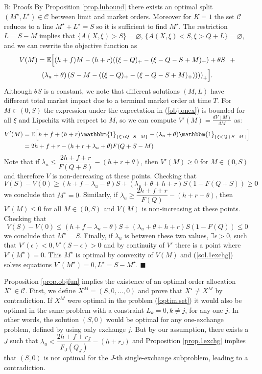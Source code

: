 \documentclass[opre,nonblindrev]{informs3}
\newcommand{\indicator}[1]{\mathbbm{1}_{\left\{ {#1} \right\} }}
\begin{document}
\begin{APPENDIX}{B: Proofs}
 By Proposition \ref{prop.lubound} there exists an optimal split $ (M^\star,L^\star)\in\mathcal{C}$ between limit and market orders. Moreover for $K=1$ the set $\mathcal{C}$ reduces to a line $M^\star+L^\star=S$ so it is sufficient to find $M^\star$. The restriction $L=S-M$ implies that $\{A(X,\xi)>S\}=\varnothing$, $\{A(X,\xi)<S, \xi>Q+L\}=\varnothing$, and we can rewrite the objective function as
\begin{multline}\label{obj.onex}
V(M)=\mathbb{E}\Bigl[(h+f)M-(h+r)((\xi-Q)_+-(\xi-Q-S+M)_+) + \theta S~~+\\
(\lambda_u+\theta)\left(S - M-((\xi-Q)_+-(\xi-Q-S+M)_+)))\right)_+\Bigr].
\end{multline}
\noindent Although $\theta S$ is a constant, we note that different solutions $(M,L)$ have different total market impact due to a terminal market order at time $T$. For $M\in(0,S)$ the expression under the expectation in (\ref{obj.onex}) is bounded for all $\xi$ and Lipschitz with respect to $M$, so we can compute $V'(M)=\frac{dV(M)}{dM}$ as:
\begin{align}
V'(M)&=\mathbb{E}\Bigl[h+f+(h+r)\indicator{\xi>Q+S-M}-(\lambda_u+\theta)\indicator{\xi<Q+S-M}\Bigr] \notag \\
&=2h+f+r-(h+r+\lambda_u+\theta)F(Q+S-M)
\end{align}
\noindent Note that if $\lambda_u\leq\dfrac{2h+f+r}{F(Q+S)}-(h+r+\theta)$, then  $V'(M)\geq 0$ for $M\in(0,S)$ and therefore $V$ is non-decreasing at these points. Checking that $$V(S)-V(0)\geq(h+f-\lambda_u-\theta)S+(\lambda_u+\theta+h+r)S(1-F(Q+S))\geq 0$$ we conclude that $M^\star = 0$. Similarly, if $\lambda_u\geq\dfrac{2h+f+r}{F(Q)}-(h+r+\theta)$, then $V'(M)\leq 0$ for all $M\in(0,S)$ and $V(M)$ is non-increasing at these points. Checking that $$V(S)-V(0)\leq(h+f-\lambda_u-\theta)S+(\lambda_u+\theta+h+r)S(1-F(Q))\leq 0$$ we conclude that $M^\star = S$. Finally, if $\lambda_u$ is between these two values, $\exists\epsilon>0$, such that $V'(\epsilon)<0, V'(S-\epsilon)>0$ and by continuity of $V'$ there is a point where $V'(M^\star)=0$. This $M^\star$ is optimal by convexity of $V(M)$ and (\ref{sol.1exchg}) solves equations $V'(M^\star)=0, L^\star=S-M^\star$. $\blacksquare$
\newline


  Proposition \ref{prop.objfun} implies the existence of an optimal order allocation $X^\star\in\mathcal{C}$. First, we define $X^M=(S,0,\dots,0)$ and prove that $X^\star\neq X^M$ by contradiction. If $X^M$ were optimal in the problem (\ref{optim.set}) it would also be optimal in the same problem with a constraint $L_k=0,k\neq j$, for any one $j$. In other words, the solution $(S, 0)$ would be optimal for any one-exchange problem, defined by using only exchange $j$. But by our assumption, there exists a $J$ such that $\lambda_u<\dfrac{2h+f+r_J}{F_J(Q_J)}-(h+r_J)$ and Proposition \ref{prop.1exchg} implies that $(S, 0)$ is not optimal for the $J$-th single-exchange subproblem, leading to a contradiction.


\end{APPENDIX}
\end{document}
